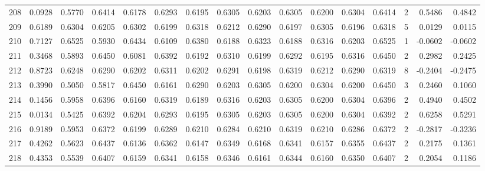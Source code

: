 \begin{tabular}{lrrrrrrrrrrrrrrr}
208 &      0.0928 &  0.5770 &  0.6414 &  0.6178 &  0.6293 &  0.6195 &  0.6305 &  0.6203 &  0.6305 &  0.6200 &   0.6304 &     0.6414 &      2 &                    0.5486 &                     0.4842 \\
209 &      0.6189 &  0.6304 &  0.6205 &  0.6302 &  0.6199 &  0.6318 &  0.6212 &  0.6290 &  0.6197 &  0.6305 &   0.6196 &     0.6318 &      5 &                    0.0129 &                     0.0115 \\
210 &      0.7127 &  0.6525 &  0.5930 &  0.6434 &  0.6109 &  0.6380 &  0.6188 &  0.6323 &  0.6188 &  0.6316 &   0.6203 &     0.6525 &      1 &                   -0.0602 &                    -0.0602 \\
211 &      0.3468 &  0.5893 &  0.6450 &  0.6081 &  0.6392 &  0.6192 &  0.6310 &  0.6199 &  0.6292 &  0.6195 &   0.6316 &     0.6450 &      2 &                    0.2982 &                     0.2425 \\
212 &      0.8723 &  0.6248 &  0.6290 &  0.6202 &  0.6311 &  0.6202 &  0.6291 &  0.6198 &  0.6319 &  0.6212 &   0.6290 &     0.6319 &      8 &                   -0.2404 &                    -0.2475 \\
213 &      0.3990 &  0.5050 &  0.5817 &  0.6450 &  0.6161 &  0.6290 &  0.6203 &  0.6305 &  0.6200 &  0.6304 &   0.6200 &     0.6450 &      3 &                    0.2460 &                     0.1060 \\
214 &      0.1456 &  0.5958 &  0.6396 &  0.6160 &  0.6319 &  0.6189 &  0.6316 &  0.6203 &  0.6305 &  0.6200 &   0.6304 &     0.6396 &      2 &                    0.4940 &                     0.4502 \\
215 &      0.0134 &  0.5425 &  0.6392 &  0.6204 &  0.6293 &  0.6195 &  0.6305 &  0.6203 &  0.6305 &  0.6200 &   0.6304 &     0.6392 &      2 &                    0.6258 &                     0.5291 \\
216 &      0.9189 &  0.5953 &  0.6372 &  0.6199 &  0.6289 &  0.6210 &  0.6284 &  0.6210 &  0.6319 &  0.6210 &   0.6286 &     0.6372 &      2 &                   -0.2817 &                    -0.3236 \\
217 &      0.4262 &  0.5623 &  0.6437 &  0.6136 &  0.6362 &  0.6147 &  0.6349 &  0.6168 &  0.6341 &  0.6157 &   0.6355 &     0.6437 &      2 &                    0.2175 &                     0.1361 \\
218 &      0.4353 &  0.5539 &  0.6407 &  0.6159 &  0.6341 &  0.6158 &  0.6346 &  0.6161 &  0.6344 &  0.6160 &   0.6350 &     0.6407 &      2 &                    0.2054 &                     0.1186 \\

\end{tabular}
